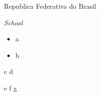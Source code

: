 \documentclass[a4paper]{article}
\newcommand{\RFB}{Republica Federativa do Brasil}
\newcommand{\eng}[1]{\textit{#1}}
\newcommand{\lista}[2]{
	\begin{itemize}
		\item #1
		\item #2
	\end{itemize}
	}
\newcommand{\arrow}[2]{
	\begin{itemize}
		#1 \rightarrow #2
	\end{itemize}
	}
\newcommand{\twoarrow}[3]{
	\begin{itemize}
		#1 \rightarrow #2 \rightarrow #3
	\end{itemize}
	}
\begin{document}
	\RFB
	
	\eng{School}
	
	\lista{a} {b}
	
	\arrow{c} {d}
	
	\twoarrow{e} {f} {g}
\end{document}
